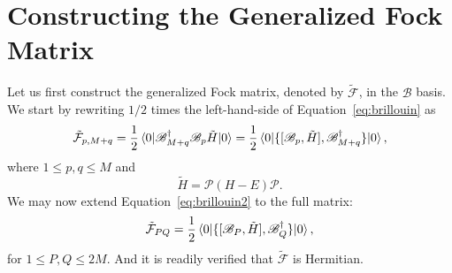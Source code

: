 \documentclass[11pt,letterpaper]{article}
\begin{document}
\section{Constructing the Generalized Fock Matrix}

Let us first construct the generalized Fock matrix, denoted by $\tilde{\mathcal{F}}$,
in the $\mathscr{B}$ basis. We start by rewriting $1/2$ times the left-hand-side of
Equation~\eqref{eq:brillouin} as
\begin{align}
  \label{eq:brillouin2}
  \tilde{\mathcal{F}}_{p, M+q}
  = \frac{1}{2} \braket{0|\mathscr{B}^\dag_{M+q} \mathscr{B}_p \tilde{H}|0}
  = \frac{1}{2} \braket{0|\{[\mathscr{B}_p, \tilde{H}], \mathscr{B}^\dag_{M+q}\}|0},
\end{align}
where $1 \leq p, q \leq M$ and
\begin{equation}
  \tilde{H} = \mathcal{P} (H - E) \mathcal{P}.
\end{equation}
We may now extend Equation~\eqref{eq:brillouin2} to the full matrix:
\begin{equation}
  \tilde{\mathcal{F}}_{PQ}
  = \frac{1}{2} \braket{0|\{[\mathscr{B}_P, \tilde{H}], \mathscr{B}^\dag_Q\}|0},
\end{equation}
for $1 \leq P, Q \leq 2M$. And it is readily verified that $\tilde{\mathcal{F}}$ is Hermitian.
\end{document}
